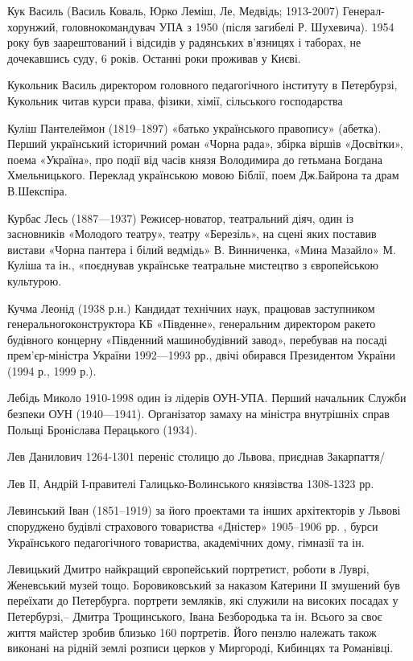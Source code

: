 Кук Василь (Василь Коваль, Юрко Леміш, Ле, Медвідь; 1913-2007) Генерал-хорунжий, головнокомандувач УПА з 1950 (після загибелі Р. Шухевича). 1954 року був заарештований і відсидів у радянських в'язницях і таборах, не дочекавшись суду, 6 років. Останні роки проживав у Києві.

Кукольник Василь директором головного педагогічного інституту в Петербурзі, Кукольник читав курси права, фізики, хімії, сільського господарства

Куліш Пантелеймон (1819–1897) «батько українського правопису» (абетка). Перший український історичний роман «Чорна рада», збірка віршів «Досвітки», поема «Україна»,  про події від часів князя Володимира до гетьмана Богдана Хмельницького. Переклад українською мовою Біблії, поем Дж.Байрона та драм В.Шекспіра.

Курбас Лесь (1887—1937) Режисер-новатор, театральний діяч, один із засновників «Молодого театру», театру «Березіль», на сцені яких поставив вистави «Чорна пантера і білий ведмідь» В. Винниченка, «Мина Мазайло» М. Куліша та ін., «поєднував українське театральне мистецтво з європейською культурою.

Кучма Леонід (1938 р.н.) Кандидат технічних наук, працював заступником генеральногоконструктора КБ «Південне», генеральним директором ракето будівного концерну «Південний машинобудівний завод», перебував на посаді прем’єр-міністра України 1992—1993 рр., двічі обирався Президентом України (1994 р., 1999 р.).

Лебідь Миколо 1910-1998 один із лідерів ОУН-УПА. Перший начальник Служби безпеки ОУН (1940—1941). Організатор замаху на міністра внутрішніх справ Польщі Броніслава Перацького (1934). 

Лев Данилович 1264-1301 переніс столицю до Львова, приєднав Закарпаття/

Лев ІІ, Андрій І-правителі Галицько-Волинського князівства 1308-1323 рр.

Левинський Іван (1851–1919) за його проектами та інших архітекторів у Львові споруджено будівлі страхового товариства «Дністер» 1905–1906 рр. , бурси Українського педагогічного товариства, академічних дому, гімназії та ін.

Левицький Дмитро найкращий європейський портретист, роботи в Луврі, Женевський музей тощо. Боровиковський за наказом Катерини ІІ змушений був переїхати до Петербурга. портрети земляків, які служили на високих посадах у Петербурзі,– Дмитра Трощинського, Івана Безбородька та ін. Всього за своє життя майстер зробив близько 160 портретів. Його пензлю належать також виконані на рідній землі розписи церков у Миргороді, Кибинцях та Романівці.

